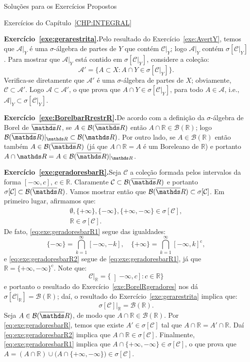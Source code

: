 \documentclass[oneside,final,11pt]{amsbook}
\newcommand{\R}{\mathds R}
\newcommand{\compl}{\mathrm c}
\newcommand{\Borel}{\mathcal B}
\theoremstyle{remark}\newtheorem{exercise}{Exercício}[chapter]
\theoremstyle{remark}\newtheorem{*exercise}[exercise]{\hbox to 0pt{\hskip 0pt minus 1fil*}Exercício}
\theoremstyle{definition}\newtheorem{exdefin}{Definição}[chapter]
\theoremstyle{plain}\newtheorem{teo}{Teorema}[section]
\theoremstyle{plain}\newtheorem{lem}[teo]{Lema}
\theoremstyle{plain}\newtheorem{prop}[teo]{Proposição}
\theoremstyle{plain}\newtheorem{cor}[teo]{Corolário}
\theoremstyle{definition}\newtheorem{defin}[teo]{Definição}
\theoremstyle{remark}\newtheorem{rem}[teo]{Observação}
\theoremstyle{definition}\newtheorem{notation}[teo]{Notação}
\theoremstyle{definition}\newtheorem{convention}[teo]{Convenção}
\theoremstyle{definition}\newtheorem{example}[teo]{Exemplo}
\numberwithin{section}{chapter}
\numberwithin{equation}{section}
\begin{document}
\begin{chapter}{Soluções para os Exercícios Propostos}
\begin{section}{Exercícios do Capítulo~\ref{CHP:INTEGRAL}}
\medskip

\textbf{Exercício~\ref{exe:gerarestrita}.}\enspace Pelo resultado do Exercício~\ref{exe:AvertY},
temos que $\mathcal A\vert_Y$ é uma $\sigma$-álgebra de partes de $Y$ que contém $\mathcal C\vert_Y$; logo $\mathcal A\vert_Y$
contém $\sigma[\mathcal C\vert_Y]$. Para mostrar que $\mathcal A\vert_Y$ está contido em
$\sigma[\mathcal C\vert_Y]$, considere a coleção:
\[\mathcal A'=\big\{A\subset X:A\cap Y\in\sigma[\mathcal C\vert_Y]\big\}.\]
Verifica-se diretamente que $\mathcal A'$ é uma $\sigma$-álgebra de partes de $X$;
obviamente, $\mathcal C\subset\mathcal A'$. Logo $\mathcal A\subset\mathcal A'$, o que
prova que $A\cap Y\in\sigma[\mathcal C\vert_Y]$, para todo $A\in\mathcal A$, i.e.,
$\mathcal A\vert_Y\subset\sigma[\mathcal C\vert_Y]$.

\medskip

\textbf{Exercício~\ref{exe:BorelbarRrestrR}.}\enspace De acordo com a definição da $\sigma$-álgebra
de Borel de $\overline\R$, se $A\in\Borel(\overline\R)$ então $A\cap\R\in\Borel(\R)$;
logo $\Borel(\overline\R)\vert_{\R}\subset\Borel(\R)$. Por outro lado, se $A\in\Borel(\R)$ então
também $A\in\Borel(\overline\R)$ (já que $A\cap\R=A$ é um Boreleano de $\R$) e portanto
$A\cap\R=A\in\Borel(\overline\R)\vert_{\R}$.

\medskip

\textbf{Exercício~\ref{exe:geradoresbarR}.}\enspace Seja $\mathcal C$ a coleção formada pelos
intervalos da forma $[-\infty,c]$, $c\in\R$. Claramente $\mathcal C\subset\Borel(\overline\R)$ e
portanto $\sigma[\mathcal C]\subset\Borel(\overline\R)$. Vamos mostrar então que $\Borel(\overline\R)\subset\sigma[\mathcal C]$.
Em primeiro lugar, afirmamos que:
\begin{gather}
\emptyset,\{+\infty\},\{-\infty\},\{+\infty,-\infty\}\in\sigma[\mathcal C],\label{eq:exe:geradoresbarR1}\\
\R\in\sigma[\mathcal C].\label{eq:exe:geradoresbarR2}
\end{gather}
De fato, \eqref{eq:exe:geradoresbarR1} segue das igualdades:
\[\{-\infty\}=\bigcap_{k=1}^\infty[-\infty,-k],\quad\{+\infty\}=\bigcap_{k=1}^\infty[-\infty,k]^\compl,\]
e \eqref{eq:exe:geradoresbarR2} segue de \eqref{eq:exe:geradoresbarR1}, já que
$\R=\{+\infty,-\infty\}^\compl$.
Note que:
\[\mathcal C\vert_{\R}=\big\{\left]-\infty,c\right]:c\in\R\big\}\]
e portanto o resultado do Exercício~\ref{exe:BorelRgeradores} nos dá $\sigma[\mathcal C\vert_{\R}]=\Borel(\R)$;
daí, o resultado do Exercício~\ref{exe:gerarestrita} implica que:
\begin{equation}\label{eq:exe:geradoresbarR}
\sigma[\mathcal C]\vert_{\R}=\Borel(\R).
\end{equation}
Seja $A\in\Borel(\overline\R)$, de modo que $A\cap\R\in\Borel(\R)$. Por \eqref{eq:exe:geradoresbarR},
temos que existe $A'\in\sigma[\mathcal C]$ tal que $A\cap\R=A'\cap\R$. Daí \eqref{eq:exe:geradoresbarR2}
implica que $A\cap\R\in\sigma[\mathcal C]$. Finalmente, \eqref{eq:exe:geradoresbarR1} implica
que $A\cap\{+\infty,-\infty\}\in\sigma[\mathcal C]$, o que prova que
$A=(A\cap\R)\cup\big(A\cap\{+\infty,-\infty\}\big)\in\sigma[\mathcal C]$.


\end{section}
\end{chapter}
\end{document}
